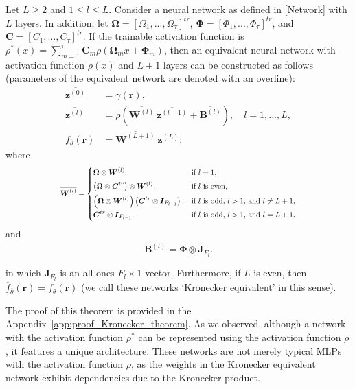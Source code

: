 \begin{theorem} \label{Kronecker_theorem}
Let $L\geq 2$ and $1\leq l \leq L$. Consider a neural network as defined in \eqref{Network} with $L$ layers. In addition, let $\boldsymbol{\Omega}=[\Omega_1,...,\Omega_\tau]^{tr}$, $\boldsymbol{\Phi}=[\Phi_1,...,\Phi_\tau]^{tr}$, and $\boldsymbol{C}=[C_1,\ldots,C_\tau]^{tr}$. If the trainable activation function is $\rho^*(x)=\sum_{m=1}^{\tau}\boldsymbol{C}_m\rho(\boldsymbol{\Omega}_mx+\boldsymbol{\Phi}_m)$, then an equivalent neural network with activation function $\rho(x)$ and $L+1$ layers can be constructed as follows (parameters of the equivalent network are denoted with an overline):
    \begin{align}
        \overline{\boldsymbol{z}^{(0)}} &= \gamma(\boldsymbol{r}), \nonumber\\
        \overline{\boldsymbol{z}^{(l)}} &= \rho\left(\overline{\boldsymbol{W}^{(l)}}~\overline{\boldsymbol{z}^{(l-1)}}+\overline{\boldsymbol{B}^{(l)}}\right), \quad l= 1,..., L, \\
        \overline{f}_{\overline{\theta}}(\boldsymbol{r}) &= \overline{\boldsymbol{W}^{(L+1)}}~\overline{\boldsymbol{z}^{(L)}}; \nonumber
    \end{align}
where
    \begin{equation} \label{weights_and_biases}
    \scalebox{0.78}{$
    \overline{\boldsymbol{W}^{(l)}} =
    \begin{cases}
        \boldsymbol{\Omega} \otimes \boldsymbol{W}^{(l)}, & \text{if $l = 1$}, \\[4pt]
        \left( \boldsymbol{\Omega} \otimes \boldsymbol{C}^{tr} \right) \otimes \boldsymbol{W}^{(l)}, & \text{if $l$ is even}, \\[4pt]
        \left( \boldsymbol{\Omega} \otimes \boldsymbol{W}^{(l)} \right) \left( \boldsymbol{C}^{tr} \otimes \boldsymbol{I}_{F_{l-1}} \right), & \text{if $l$ is odd, $l > 1$, and $l \neq L+1$}, \\[4pt]
        \boldsymbol{C}^{tr} \otimes \boldsymbol{I}_{F_{l-1}}, & \text{if $l$ is odd, $l > 1$, and $l = L+1$}.
    \end{cases}$}
\end{equation}
and
\begin{equation}
    \overline{\boldsymbol{B}^{(l)}} = \boldsymbol{\Phi} \otimes \boldsymbol{J}_{F_l}.
\end{equation}



in which $\boldsymbol{J}_{F_l}$ is an all-ones $F_l\times 1$ vector. Furthermore, if $L$ is even, then $\overline{f}_{\overline{\theta}}(\boldsymbol{r})=f_\theta(\boldsymbol{r})$ (we call these networks \lq Kronecker equivalent' in this sense).
\end{theorem}
The proof of this theorem is provided in the Appendix~\ref{app:proof_Kronecker_theorem}. As we observed, although a network with the activation function $\rho^*$ can be represented using the activation function $\rho$, it features a unique architecture. These networks are not merely typical MLPs with the activation function $\rho$, as the weights in the Kronecker equivalent network exhibit dependencies due to the Kronecker product.

